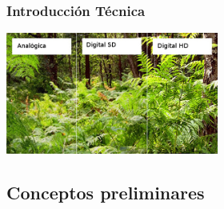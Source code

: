 \documentclass[a4paper,11pt]{beamer}
\begin{document}
	\begin{frame}
		\frametitle{Introducción Técnica}
		\begin{center}
			\includegraphics[height=4cm]{analog_vs_digital_sd_hd.jpg} 
		\end{center}
	\end{frame}

	\subsection{Conceptos preliminares}
\end{document}
